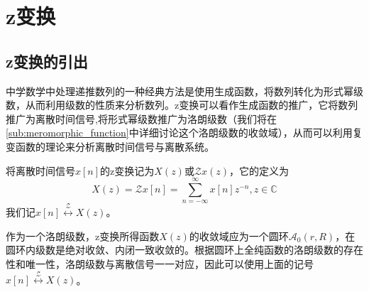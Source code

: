 \section{z变换}\label{sec:z_Transform}

\subsection{z变换的引出}\label{sub:inteoduction_of_z}
中学数学中处理递推数列的一种经典方法是使用生成函数，将数列转化为形式幂级数，从而利用级数的性质来分析数列。z变换可以看作生成函数的推广，它将数列推广为离散时间信号,将形式幂级数推广为洛朗级数（我们将在\ref{sub:meromorphic_function}中详细讨论这个洛朗级数的收敛域），从而可以利用复变函数的理论来分析离散时间信号与离散系统。
\begin{definition}[z变换]
    将离散时间信号$x[n]$的z变换记为$X(z)$或$\mathcal{Z} x(z)$，它的定义为
    \[X(z)=\mathcal{Z} x[n]=\sum_{n=-\infty}^{\infty}x[n]z^{-n},z\in\mathbb{C}\]
    我们记$x[n]\overset{\mathcal{Z} }{\longleftrightarrow}X(z)$。
\end{definition}
作为一个洛朗级数，z变换所得函数$X(z)$的收敛域应为一个圆环$\mathcal{A}_0(r,R)$，在圆环内级数是绝对收敛、内闭一致收敛的。根据圆环上全纯函数的洛朗级数的存在性和唯一性，洛朗级数与离散信号一一对应，因此可以使用上面的记号$x[n]\overset{\mathcal{Z} }{\longleftrightarrow}X(z)$。

